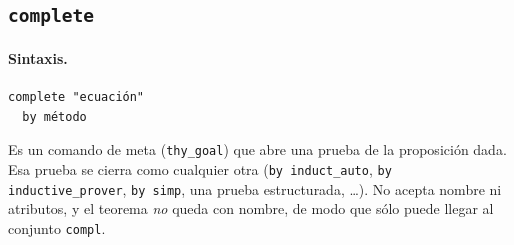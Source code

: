 \documentclass[11pt,a4paper]{article}
\newcommand{\isa}[1]{\texttt{#1}}
\theoremstyle{definition}
\theoremstyle{remark}
\begin{document}
\subsection{\texttt{complete}}
\label{sec:complete}

\paragraph{Sintaxis.}
\begin{lstlisting}
complete "ecuación"
  by método
\end{lstlisting}
Es un comando de meta (\isa{thy\_goal}) que abre una prueba de la proposición dada.
Esa prueba se cierra como cualquier otra (\isa{by induct\_auto},
\isa{by inductive\_prover}, \isa{by simp}, una prueba estructurada, \ldots). No
acepta nombre ni atributos, y el teorema \emph{no} queda con nombre, de modo que
sólo puede llegar al conjunto \isa{compl}.
\end{document}
